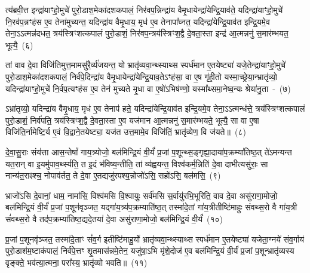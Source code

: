 त्य॑ब्रवी॒त्त इन्द्रा॑याꣳहो॒मुचे॑ पुरो॒डाश॒मेका॑\-दश\-कपालं॒ निर॑वप॒न्निन्द्रा॑य वैमृ॒धायेन्द्रा॑ये\-न्द्रि॒याव॑ते॒ यदिन्द्रा॑याꣳहो॒मुचे॑ नि॒रव॑प॒न्नꣳह॑स ए॒व तेना॑मुच्यन्त॒ यदिन्द्रा॑य वैमृ॒धाय॒ मृध॑ ए॒व तेनापा᳚घ्नत॒ यदिन्द्रा॑येन्द्रि॒याव॑त इन्द्रि॒यमे॒व तेना॒\-ऽऽ\-त्मन्न॑दधत॒ त्रय॑स्त्रिꣳशत्कपालं पुरो॒डाशं॒ निर॑वप॒न्त्रय॑स्त्रिꣳश॒द्वै दे॒वता॒स्ता इन्द्र॑ आ॒त्मन्ननु॑ स॒मार॑म्भयत॒ भूत्यै॒~(६)\ip

तां वाव दे॒वा विजि॑तिमुत्त॒मामसु॑रै॒र्व्य॑जयन्त॒ यो भ्रातृ॑व्यवा॒न्थ्स्याथ्स स्पर्ध॑मान ए॒तयेष्ट्या॑ यजे॒तेन्द्रा॑याꣳहो॒मुचे॑ पुरो॒डाश॒मेका॑\-दश\-कपालं॒ निर्व॑पे॒दिन्द्रा॑य वैमृ॒धायेन्द्रा॑येन्द्रि॒याव॒ते\-ऽꣳह॑सा॒ वा ए॒ष गृ॑ही॒तो यस्मा॒च्छ्रेया॒न्भ्रातृ॑व्यो॒ यदिन्द्रा॑याꣳहो॒मुचे॑ नि॒र्वप॒त्यꣳह॑स ए॒व तेन॑ मुच्यते मृ॒धा वा ए॒षो॑\-ऽभिष॑ण्णो॒ यस्मा᳚थ्समा॒नेष्व॒न्यः श्रेया॑नु॒ता~-~(७)\ip

ऽभ्रा॑तृव्यो॒ यदिन्द्रा॑य वैमृ॒धाय॒ मृध॑ ए॒व तेनाप॑ हते॒ यदिन्द्रा॑येन्द्रि॒याव॑त इन्द्रि॒यमे॒व तेना॒\-ऽऽ\-त्मन्ध॑त्ते॒ त्रय॑स्त्रिꣳशत्कपालं पुरो॒डाशं॒ निर्व॑पति॒ त्रय॑स्त्रिꣳश॒द्वै दे॒वता॒स्ता ए॒व यज॑मान आ॒त्मन्ननु॑ स॒मार॑म्भयते॒ भूत्यै॒ सा वा ए॒षा विजि॑ति॒र्नामेष्टि॒र्य ए॒वं वि॒द्वाने॒तयेष्ट्या॒ यज॑त उत्त॒मामे॒व विजि॑तिं॒ भ्रातृ॑व्येण॒ वि ज॑यते॥~(८)\ip

{\anuvakamend[{इ॒न्द्रि॒याव॑ती॒ भूत्या॑ उ॒तैका॒न्नप॑ञ्चा॒शच्च॑}]}

दे॒वा॒सु॒राः संय॑त्ता आस॒न्तेषां᳚ गाय॒त्र्योजो॒ बल॑मिन्द्रि॒यं वी॒र्यं॑ प्र॒जां प॒शून्थ्स॒ङ्गृह्या॒दाया॑प॒\-क्रम्या॑तिष्ठ॒त् ते॑\-ऽमन्यन्त यत॒रान् वा इ॒यमु॑पाव॒र्थ्स्यति॒ त इ॒दं भ॑विष्य॒न्तीति॒ तां व्य॑ह्वयन्त॒ विश्व॑कर्म॒न्निति॑ दे॒वा दाभीत्यसु॑राः॒ सा नान्य॑त॒राꣴश्च॒ नोपाव॑र्तत॒ ते दे॒वा ए॒तद्यजु॑रपश्य॒न्नोजो॑\-ऽसि॒ सहो॑\-ऽसि॒ बल॑मसि॒~(९)\ip

भ्राजो॑\-ऽसि दे॒वानां॒ धाम॒ नामा॑सि॒ विश्व॑मसि वि॒श्वायुः॒ सर्व॑मसि स॒र्वायु॑रभि॒भूरिति॒ वाव दे॒वा असु॑राणा॒मोजो॒ बल॑मिन्द्रि॒यं वी॒र्यं॑ प्र॒जां प॒शून॑वृञ्जत॒ यद्गा॑य॒त्र्य॑प॒क्रम्याति॑ष्ठ॒त् तस्मा॑दे॒तां गा॑य॒त्रीतीष्टि॑माहुः संवथ्स॒रो वै गा॑य॒त्री सं॑वथ्स॒रो वै तद॑प॒क्रम्या॑तिष्ठ॒द्यदे॒तया॑ दे॒वा असु॑राणा॒मोजो॒ बल॑मिन्द्रि॒यं वी॒र्यं॑~(१०)\ip

प्र॒जां प॒शूनवृ॑ञ्जत॒ तस्मा॑दे॒ताꣳ सं॑व॒र्ग इतीष्टि॑माहु॒र्यो भ्रातृ॑व्यवा॒न्थ्स्याथ्स स्पर्ध॑मान ए॒तयेष्ट्या॑ यजेता॒ग्नये॑ संव॒र्गाय॑ पुरो॒डाश॑\-म॒ष्टा\-क॑पालं॒ निर्व॑पे॒त्तꣳ शृ॒तमास॑न्नमे॒तेन॒ यजु॑षा॒\-ऽभि मृ॑शे॒दोज॑ ए॒व बल॑मिन्द्रि॒यं वी॒र्यं॑ प्र॒जां प॒शून्भ्रातृ॑व्यस्य वृङ्क्ते॒ भव॑त्या॒त्मना॒ परा᳚स्य॒ भ्रातृ॑व्यो भवति॥~(११)\ip

{\anuvakamend[{बल॑मस्ये॒तया॑ दे॒वा असु॑राणा॒मोजो॒ बल॑मिन्द्रि॒यं वी॒र्यं॑ पञ्च॑चत्वारिꣳशच्च}]}

